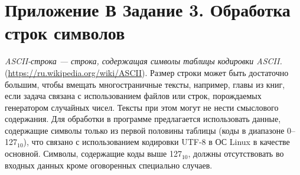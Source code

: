\chapter*{Приложение В Задание 3. Обработка строк символов}

\textit{ASCII-строка --- строка, содержащая символы таблицы кодировки ASCII.} (\url{https://ru.wikipedia.org/wiki/ASCII}). Размер строки может быть достаточно большим, чтобы вмещать многостраничные тексты, например, главы из книг, если задача связана с использованием файлов или строк, порождаемых генератором случайных чисел. Тексты при этом могут не нести смыслового содержания. Для обработки в программе предлагается использовать данные, содержащие символы только из первой половины таблицы (коды в диапазоне 0--127$_{10}$), что связано с использованием кодировки UTF-8 в ОС Linux в качестве основной. Символы, содержащие коды выше 127$_{10}$, должны отсутствовать во входных данных кроме оговоренных специально случаев.

